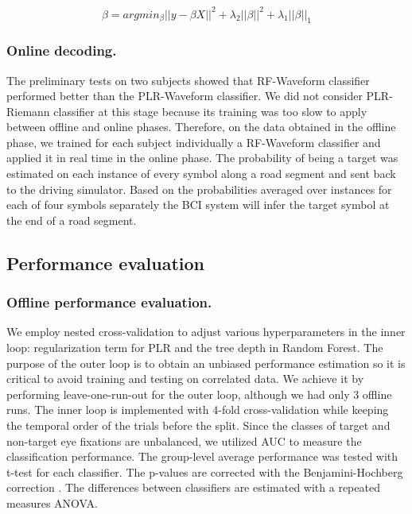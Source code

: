 \documentclass[12pt]{iopart}
\begin{document}
\begin{equation}
\beta= arg min_{\beta} {|| y - \beta X||}^2 + \lambda_2 {||\beta||}^2+\lambda_1 {||\beta||}_1
\end{equation}

\subsubsection*{Online decoding.}
The preliminary tests on two subjects showed that RF-Waveform classifier
performed better than the PLR-Waveform classifier. We did not consider
PLR-Riemann classifier at this stage because its training
was too slow to apply between offline and online phases.
Therefore, on the data obtained in the offline phase, we trained for each subject individually a RF-Waveform classifier
and applied it in real time in the online phase.
The probability of being a target was estimated on each instance of every symbol along a road segment and sent back to the driving simulator. Based on the probabilities averaged over instances for each of four symbols separately the BCI system will infer the target symbol at the end of a road segment.


\subsection{Performance evaluation}

\subsubsection*{Offline performance evaluation.}
We employ nested cross-validation to adjust various hyperparameters in the inner loop:
regularization term for PLR and the tree depth in Random Forest.
The purpose of the outer loop is to obtain an unbiased performance estimation
so it is critical to avoid training and testing on correlated data.
We achieve it by performing leave-one-run-out for the outer loop,
although we had only 3 offline runs.
The inner loop is implemented with 4-fold cross-validation while keeping
the temporal order of the trials before the split.
Since the classes of target and non-target eye fixations are unbalanced,
we utilized AUC to measure the classification performance.
The group-level average performance was tested with t-test for each classifier.
The p-values are corrected with 
the Benjamini-Hochberg correction \cite{benjamini_controlling_1995}.
The differences between classifiers are estimated with a repeated measures ANOVA.
\end{document}
